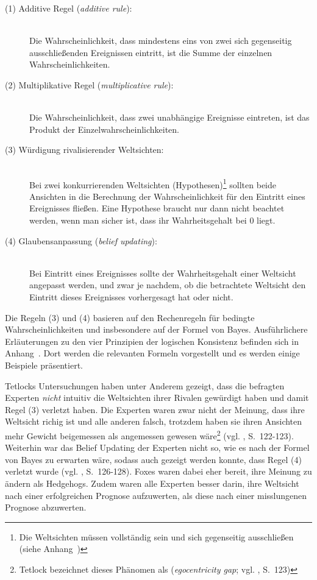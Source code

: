 \begin{description}
\item[(1) Additive Regel (\emph{additive rule}):] \hfill \\
Die Wahrscheinlichkeit, dass mindestens eins von zwei sich gegenseitig
ausschließenden Ereignissen eintritt, ist die Summe der einzelnen
Wahrscheinlichkeiten.

\item[(2) Multiplikative Regel (\emph{multiplicative rule}):] \hfill \\
Die Wahrscheinlichkeit, dass zwei unabhängige Ereignisse eintreten, ist das
Produkt der Einzelwahrscheinlichkeiten.

\item[(3) Würdigung rivalisierender Weltsichten:] \hfill \\
Bei zwei konkurrierenden Weltsichten (Hypothesen)\footnote{
Die Weltsichten  müssen vollständig sein und sich gegenseitig
ausschließen (siehe Anhang~\xcom)
} sollten beide Ansichten in die Berechnung der Wahrscheinlichkeit für den
Eintritt eines Ereignisses fließen. Eine Hypothese braucht nur dann nicht
beachtet werden, wenn man sicher ist, dass ihr Wahrheitsgehalt bei 0 liegt.

\item[(4) Glaubensanpassung (\emph{belief updating}):] \hfill \\
Bei Eintritt eines Ereignisses sollte der Wahrheitsgehalt einer Weltsicht
angepasst werden, und zwar je nachdem, ob die betrachtete Weltsicht den Eintritt
dieses Ereignisses vorhergesagt hat oder nicht.

\end{description}

Die Regeln (3) und (4) basieren auf den Rechenregeln für bedingte
Wahrscheinlichkeiten und insbesondere auf der Formel von Bayes. Ausführlichere
Erläuterungen zu den vier Prinzipien der logischen Konsistenz befinden sich in
Anhang~\xcom. Dort werden die relevanten Formeln vorgestellt und es werden
einige Beispiele präsentiert.

Tetlocks Untersuchungen haben unter Anderem gezeigt, dass die befragten Experten
\emph{nicht} intuitiv die Weltsichten ihrer Rivalen gewürdigt haben und damit
Regel (3) verletzt haben. Die Experten waren zwar nicht der Meinung, dass ihre
Weltsicht richig ist und alle anderen falsch, trotzdem haben sie ihren Ansichten
mehr Gewicht beigemessen als angemessen gewesen wäre\footnote{
Tetlock bezeichnet dieses Phänomen als \grqq{}
(\emph{egocentricity gap}; vgl. \cite{Tetlock}, S.~123)
} (vgl. \cite{Tetlock}, S.~122-123). Weiterhin war das Belief Updating der
Experten nicht so, wie es nach der Formel von Bayes zu erwarten wäre, sodass
auch gezeigt werden konnte, dass Regel (4) verletzt wurde (vgl. \cite{Tetlock},
S.~126-128). Foxes waren dabei eher bereit, ihre Meinung zu ändern als
Hedgehogs. Zudem waren alle Experten besser darin, ihre Weltsicht nach einer
erfolgreichen Prognose aufzuwerten, als diese nach einer misslungenen Prognose
abzuwerten.

